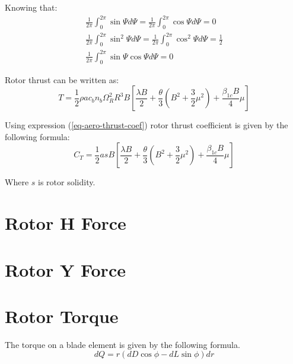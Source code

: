 Knowing that: \cite{GessowMyers1985}
\begin{gather}
  \frac{1}{2\pi} \int_{0}^{2\pi} \sin \Psi d\Psi =
  \frac{1}{2\pi} \int_{0}^{2\pi} \cos \Psi d\Psi = 0 \\
  \frac{1}{2\pi} \int_{0}^{2\pi} \sin^2 \Psi d\Psi =
  \frac{1}{2\pi} \int_{0}^{2\pi} \cos^2 \Psi d\Psi = \frac{1}{2} \\
  \frac{1}{2\pi} \int_{0}^{2\pi} \sin \Psi \cos \Psi d\Psi = 0
\end{gather}

Rotor thrust can be written as:
\begin{equation}
  T = \frac{1}{2} \rho a c_b n_b \Omega_R^2 R^3 B
  \left[
    \frac{\lambda B}{2} 
    +
    \frac{\theta}{3} \left( B^2 + \frac{3}{2} \mu^2 \right)
    +
    \frac{\beta_{1c} B}{4} \mu
  \right]
\end{equation}

Using expression (\ref{eq-aero-thrust-coef}) rotor thrust coefficient is given by the following formula:
\begin{equation}
  C_T = \frac{1}{2} a s B
  \left[
    \frac{\lambda B}{2}
    +
    \frac{\theta}{3} \left( B^2 + \frac{3}{2} \mu^2 \right)
    +
    \frac{\beta_{1c} B}{4} \mu
  \right]
\end{equation}

Where $s$ is rotor solidity.


\section{Rotor H Force}



\section{Rotor Y Force}



\section{Rotor Torque}

The torque on a blade element is given by the following formula. \cite{GessowMyers1985, Bramwell2001}
\begin{equation}
  \label{eq-aero-blade-section-torque}
  dQ = r \left( dD \cos \phi - dL \sin \phi \right) dr
\end{equation}

